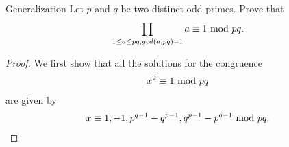 
\begin{mysubsection}{}
    \begin{theorem}[thm:]{Generalization}
        Let $p$ and $q$ be two distinct odd primes. Prove that
        \begin{alignat*}{1}
            \prod_{1\leq a\leq pq,gcd(a,pq)=1}a\equiv 1 \textnormal{ mod }pq.
        \end{alignat*}
    \end{theorem}

    \begin{proof}
        We first show that all the solutions for the congruence
        \begin{alignat*}{1}
            x^2\equiv 1\textnormal{ mod }pq
        \end{alignat*}
        are given by
        \begin{alignat*}{1}
            x\equiv 1,-1,p^{q-1}-q^{p-1}, q^{p-1}-p^{q-1} \textnormal{ mod }pq.
        \end{alignat*}
    \end{proof}

\end{mysubsection}

